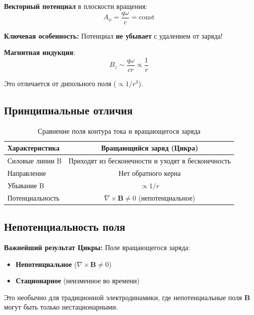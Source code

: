 \documentclass[12pt,a4paper]{article}
\begin{document}
\textbf{Векторный потенциал} в плоскости вращения:
\begin{equation}
    A_\phi = \frac{q\omega}{c} = \text{const}
\end{equation}

\textbf{Ключевая особенность:} Потенциал \textbf{не убывает} с удалением от заряда!

\textbf{Магнитная индукция}:
\begin{equation}
    B_z \sim \frac{q\omega}{cr} \propto \frac{1}{r}
\end{equation}

Это отличается от дипольного поля ($\propto 1/r^3$).

\subsection{Принципиальные отличия}

\begin{table}[h]
\centering
\caption{Сравнение поля контура тока и вращающегося заряда}
\label{tab:comparison}
\begin{tabular}{lc}
\toprule
\textbf{Характеристика} & \textbf{Вращающийся заряд (Цикра)} \\
\midrule
Силовые линии B & Приходят из бесконечности и уходят в бесконечность \\
Направление & Нет обратного керна \\
Убывание B & $\propto 1/r$ \\
Потенциальность & $\nabla \times \mathbf{B} \neq 0$ (непотенциальное) \\
\bottomrule
\end{tabular}
\end{table}

\subsection{Непотенциальность поля}

\textbf{Важнейший результат Цикры:} Поле вращающегося заряда:
\begin{itemize}
    \item \textbf{Непотенциальное} ($\nabla \times \mathbf{B} \neq 0$)
    \item \textbf{Стационарное} (неизменное во времени)
\end{itemize}

Это необычно для традиционной электродинамики, где непотенциальные поля $\mathbf{B}$ могут быть только нестационарными.
\end{document}
